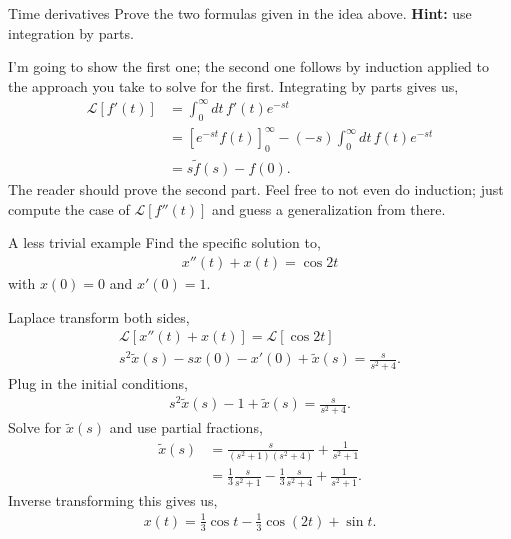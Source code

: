 \documentclass[11pt]{article}
\theoremstyle{mystyle}
\begin{document}
\begin{psexample}{Time derivatives}{}
        Prove the two formulas given in the idea above. \textbf{Hint:} use
        integration by parts.
\end{psexample}
    \begin{pssolution}{}{}
        I'm going to show the first one; the second one follows
        by induction applied to the approach you take to solve
        for the first. Integrating by parts gives us,
        \begin{align*}
            \mathcal{L}[f'(t)] & = \int_0^\infty dt \, f'(t) e^{-st}\\
            & = [e^{-st} f(t) ]_0^\infty - (-s) \int_0^\infty dt \, f(t) e^{-st}\\
            & = s\tilde{f}(s) - f(0).
        \end{align*}
        The reader should prove the second part. Feel free to
        not even do induction; just compute the case of $\mathcal{L}[f''(t)]$
        and guess a generalization from there.
    \end{pssolution}

\begin{psexample}{A less trivial example}{}
        Find the specific solution to,
        \begin{align*}
            x''(t) + x(t) = \cos{2t}
        \end{align*}
        with $x(0) = 0$ and $x'(0) = 1$.
\end{psexample}

\begin{pssolution}{}{}
    Laplace transform both sides,
    \begin{align*}
       \mathcal{L}[x''(t) + x(t)] = \mathcal{L}[\cos{2t}]\\
       s^2 \tilde{x}(s) - sx(0) - x'(0) + \tilde{x}(s) = \frac{s}{s^2 + 4}.
    \end{align*}
    Plug in the initial conditions,
    \begin{align*}
        s^2 \tilde{x}(s) - 1 + \tilde{x}(s) = \frac{s}{s^2 + 4}.
    \end{align*}
    Solve for $\tilde{x}(s)$ and use partial fractions,
    \begin{align*} 
        \tilde{x}(s) & = \frac{s}{(s^2 + 1)(s^2 + 4)} + \frac{1}{s^2 + 1}\\
        & = \frac{1}{3} \frac{s}{s^2 + 1} - \frac{1}{3}\frac{s}{s^2 + 4} + \frac{1}{s^2 + 1}.
    \end{align*}
    Inverse transforming this gives us,
    \begin{align*}
        x(t) = \frac{1}{3}\cos{t} - \frac{1}{3} \cos{(2t)} + \sin{t}.
    \end{align*}
\end{pssolution}
\end{document}
